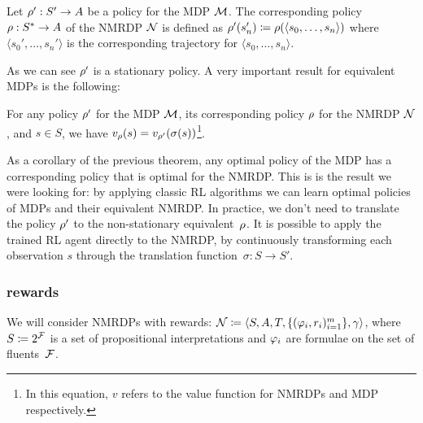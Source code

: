 \begin{definition}
	\cite{bib:nmrdp-logic-first} Let $\rho': S' \to A$ be a policy for the
	MDP $\mathcal{M}$. The corresponding policy $\rho: S^* \to A$ of the NMRDP
	$\mathcal{N}$ is defined as $\rho'(s_n') \coloneqq \rho(\langle s_0,
	\dots, s_n \rangle)$ where $\langle s_0', \dots, s_n' \rangle$ is the
	corresponding trajectory for $\langle s_0, \dots, s_n \rangle$.
\end{definition}
As we can see $\rho'$ is a stationary policy. A very important result for
equivalent MDPs is the following:
\begin{theorem}
	\cite{bib:nmrdp-logic-first} For any policy $\rho'$ for the MDP $\mathcal{M}$,
	its corresponding policy $\rho$ for the NMRDP $\mathcal{N}$, and $s \in S$,
	we have $v_\rho(s) = v_{\rho'}(\sigma(s))$\footnote{In this equation,
	$v$ refers to the value function for NMRDPs and MDP respectively.}.
\end{theorem}
As a corollary of the previous theorem, any optimal policy of the MDP has a
corresponding policy that is optimal for the NMRDP. This is is the result we
were looking for: by applying classic RL algorithms we can learn optimal
policies of MDPs and their equivalent NMRDP. In practice, we don't need to
translate the policy $\rho'$ to the non-stationary equivalent~$\rho$.
It is possible to apply the trained RL agent directly to the NMRDP, by
continuously transforming each observation $s$ through the translation
function~$\sigma: S \to S'$.


\subsubsection*[LDLf rewards]{\ldl{} rewards}

We will consider NMRDPs with \ldl{} rewards: $\mathcal{N} \coloneqq \langle S, A,
T, \{(\varphi_i, r_i)_{i=1}^m\}, \gamma \rangle$, where $S \coloneqq
2^{\mathcal{F}}$ is a set of propositional interpretations and $\varphi_i$ are
\ldl{} formulae on the set of fluents~$\mathcal{F}$.





